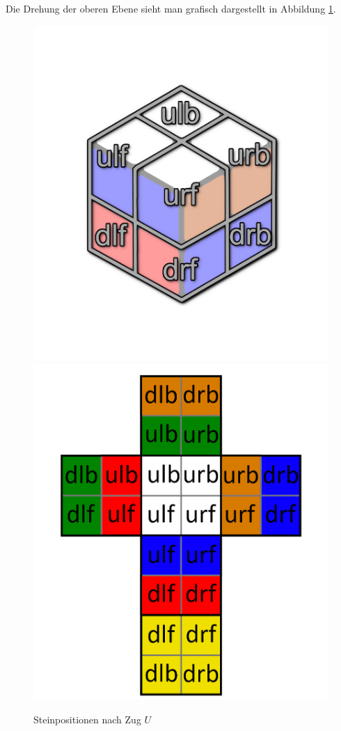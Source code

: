 \documentclass[12pt,a4paper, usenames, dvipsnames]{article}
\begin{document}
Die Drehung der oberen Ebene sieht man grafisch dargestellt in Abbildung \ref{15}.
\begin{figure}[h]
\centering
\includegraphics[scale=0.13]{caged_spin.png}
\includegraphics[scale=0.13]{foldedout_spin.png}
\caption[Steinpositionen nach Zug $U$]{Steinpositionen nach Zug $U$}
\label{15}
\end{figure}
\end{document}
